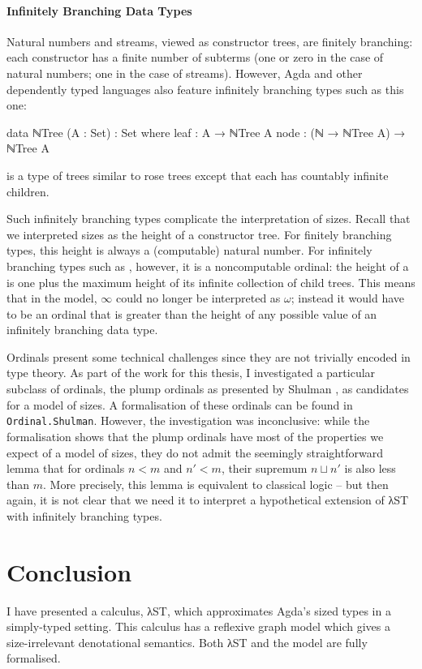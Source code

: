 \paragraph{Infinitely Branching Data Types}

Natural numbers and streams, viewed as constructor trees, are finitely
branching: each constructor has a finite number of subterms (one or zero in the
case of natural numbers; one in the case of streams). However, Agda and other
dependently typed languages also feature infinitely branching types such as this
one:
\begin{code}
  data ℕTree (A : Set) : Set where
    leaf : A → ℕTree A
    node : (ℕ → ℕTree A) → ℕTree A
\end{code}
 is a type of trees similar to rose trees except that each
 has countably infinite children.

Such infinitely branching types complicate the interpretation of sizes. Recall
that we interpreted sizes as the height of a constructor tree. For finitely
branching types, this height is always a (computable) natural number. For
infinitely branching types such as , however, it is a noncomputable
ordinal: the height of a  is one plus the maximum height of its
infinite collection of child trees. This means that in the model, $∞$ could no
longer be interpreted as $ω$; instead it would have to be an ordinal that is
greater than the height of any possible value of an infinitely branching data
type.

Ordinals present some technical challenges since they are not trivially encoded
in type theory. As part of the work for this thesis, I investigated a particular
subclass of ordinals, the plump ordinals \cite{taylor1996} as presented by
Shulman \cite{shulman2014}, as candidates for a model of sizes. A formalisation
of these ordinals can be found in \texttt{Ordinal.\allowbreak Shulman}. However,
the investigation was inconclusive: while the formalisation shows that the plump
ordinals have most of the properties we expect of a model of sizes, they do not
admit the seemingly straightforward lemma that for ordinals $n < m$ and $n′ <
m$, their supremum $n ⊔ n′$ is also less than $m$. More precisely, this lemma is
equivalent to classical logic -- but then again, it is not clear that we need it
to interpret a hypothetical extension of λST with infinitely branching types.


\section{Conclusion}
\label{sec:conclusion:conclusion}

I have presented a calculus, λST, which approximates Agda's sized types in a
simply-typed setting. This calculus has a reflexive graph model which gives a
size-irrelevant denotational semantics. Both λST and the model are fully
formalised.

